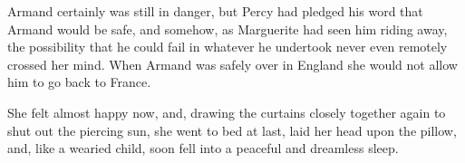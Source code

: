 Armand certainly was still in danger, but Percy had pledged his word that Armand would be safe, and somehow, as Marguerite had seen him riding away, the possibility that he could fail in whatever he undertook never even remotely crossed her mind. When Armand was safely over in England she would not allow him to go back to France.

She felt almost happy now, and, drawing the curtains closely together again to shut out the piercing sun, she went to bed at last, laid her head upon the pillow, and, like a wearied child, soon fell into a peaceful and dreamless sleep.